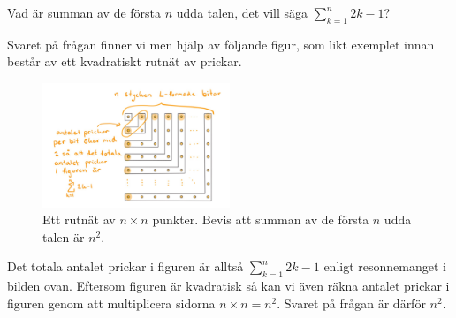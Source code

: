 \documentclass[nobib]{tufte-handout}
\begin{document}
\begin{example}
  Vad är summan av de första $n$ udda talen, det vill säga $\sum_{k=1}^n 2k-1$?
  
  Svaret på frågan finner vi men hjälp av följande figur, som likt exemplet innan består av ett kvadratiskt rutnät av prickar. 
  
  \begin{figure}[h]
    \centering
    \includegraphics[width=0.5\textwidth]{graphics/Gauss square proof.jpg}
    \caption{Ett rutnät av $n\times n$ punkter. Bevis att summan av de första $n$ udda talen är $n^2$.}
  \end{figure}
  
  Det totala antalet prickar i figuren är alltså $\sum_{k=1}^n 2k-1$ enligt resonnemanget i bilden ovan. Eftersom figuren är kvadratisk så kan vi även räkna antalet prickar i figuren genom att multiplicera sidorna $n\times n=n^2$. Svaret på frågan är därför $n^2$. 
\end{example}
\end{document}
